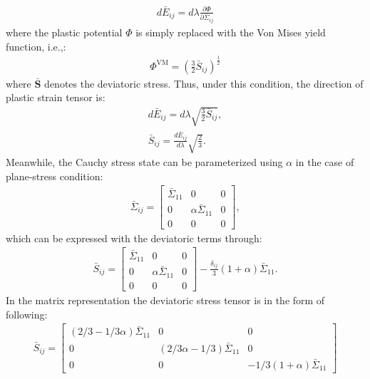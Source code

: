 \documentclass[12pt]{amsart}
\begin{document}
\begin{eqnarray}
  d\bar{E}_{ij} = d\lambda \frac{\partial \Phi}{\partial \bar{\Sigma}_{ij}}
\end{eqnarray}
where the plastic potential $\Phi$ is simply replaced with the Von Mises yield function, i.e.,:
\begin{eqnarray}
  \Phi^\mathrm{VM} = (\frac{3}{2} \bar{S}_{ij})^{\frac{1}{2}}
\end{eqnarray}
where $\boldsymbol{\bar{S}}$ denotes the deviatoric stress.
Thus, under this condition, the direction of plastic strain tensor is:
\begin{subequations}
  \label{eq:asf}
  \begin{eqnarray}
    d\bar{E}_{ij} = d\lambda \sqrt{\frac{3}{2}\bar{S}_{ij}}, \\
    \bar{S}_{ij} = \frac{d\bar{E}_{ij}}{d\lambda} \sqrt{\frac{2}{3}}.
  \end{eqnarray}
\end{subequations}
Meanwhile, the Cauchy stress state can be parameterized using $\alpha$ in the case of plane-stress condition:
\begin{eqnarray}
\bar{\Sigma}_{ij} =
\begin{bmatrix}
  \bar{\Sigma}_{11} &0                       &0\\
  0                 &\alpha \bar{\Sigma}_{11}&0\\
  0                 &0                       &0
\end{bmatrix},
\end{eqnarray}
which can be expressed with the deviatoric terms through:
\begin{eqnarray}
\bar{S}_{ij} =
\begin{bmatrix}
  \bar{\Sigma}_{11} &0                       &0\\
  0                 &\alpha \bar{\Sigma}_{11}&0\\
  0                 &0                       &0
\end{bmatrix}
-\frac{\delta_{ij}}{3} (1+\alpha) \bar{\Sigma}_{11}.
\end{eqnarray}
In the matrix representation the deviatoric stress tensor is in the form of following:
\begin{eqnarray}
\bar{S}_{ij} =
\begin{bmatrix}
  (2/3-1/3\alpha)\bar{\Sigma}_{11} &0                       &0\\
  0                                &(2/3\alpha - 1/3) \bar{\Sigma}_{11}&0\\
  0                 &0                       &-1/3(1+\alpha) \bar{\Sigma}_{11}
\end{bmatrix}
\end{eqnarray}
\end{document}
